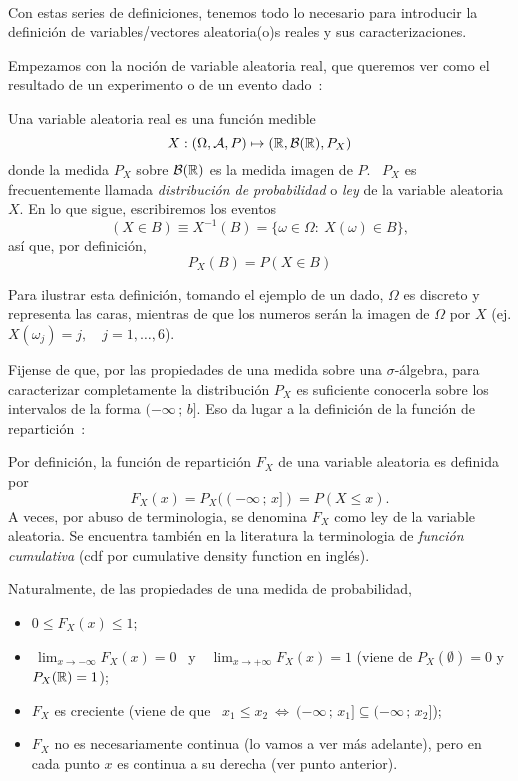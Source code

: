 \

Con estas series  de definiciones, tenemos todo lo  necesario para introducir la
definici\'on de variables/vectores aleatoria(o)s reales y sus caracterizaciones.



\label{Ssec:MP:VAGeneral}

Empezamos con la  noci\'on de variable aleatoria real, que  queremos ver como el
resultado de un experimento o de un evento dado~\cite{AthLah06, Coh13, Bre88}:
%
\begin{definicion}
  Una variable aleatoria real es una funci\'on medible
  \[
  X: (\Omega,\mathcal{A},P) \mapsto (\mathbb{R},\mathcal{B}(\mathbb{R}),P_X)
  \]
  donde la medida  $P_X$ sobre $\mathcal{B}(\mathbb{R})$ es la medida imagen  de $P$.  \ $P_X$
  es frecuentemente llamada {\it distribuci\'on  de probabilidad} o {\it ley} de
  la variable aleatoria $X$. En lo que sigue, escribiremos los eventos
  \[
  (X \in B) \equiv X^{-1}(B) = \{ \omega \in \Omega: \: X(\omega) \in B \},
  \]
  as\'i que, por definici\'on,
  \[
  P_X(B) = P(X \in B)
  \]
\end{definicion}
%
Para  ilustrar esta definici\'on,  tomando el  ejemplo de  un dado,  $\Omega$ es
discreto y representa  las caras, mientras de que los  numeros ser\'an la imagen
de $\Omega$ por $X$ (ej. $X(\omega_j) = j, \quad j = 1, \ldots , 6$).

Fijense de que, por las  propiedades de una medida sobre una $\sigma$-\'algebra,
para caracterizar completamente la  distribuci\'on $P_X$ es suficiente conocerla
sobre  los intervalos de  la forma  $(-\infty \,  ; \,  b]$. Eso  da lugar  a la
definici\'on  de  la funci\'on  de  repartici\'on~\cite{AthLah06, Coh13,  Bre88,
  HogMck13}:
%
\begin{definicion}
  Por  definici\'on,  la  funci\'on  de  repartici\'on  $F_X$  de  una  variable
  aleatoria es definida por
  \[
  F_X(x) = P_X((-\infty \, ; \, x]) = P(X \le x).
  \]
  A veces, por abuso de terminologia,  se denomina $F_X$ como ley de la variable
  aleatoria. Se  encuentra tambi\'en  en la literatura  la terminologia  de {\it
    funci\'on cumulativa} (cdf por cumulative density function en ingl\'es).
\end{definicion}
%
Naturalmente, de las propiedades de una medida de probabilidad,
%
\begin{itemize}
\item $0 \le F_X(x) \le 1$;
%
\item $\displaystyle \, \lim_{x \to -\infty} F_X(x) = 0$ \ y \ $\displaystyle \,
  \lim_{x \to +\infty} F_X(x) = 1$  (viene de $P_X(\emptyset) = 0$ y $P_X(\mathbb{R})
  = 1$);
%
\item  $F_X$ es creciente  \big(viene de  que \  $x_1 \le  x_2 \:  \Leftrightarrow \:
  (-\infty \, ; \, x_1] \subseteq (-\infty \, ; \, x_2]$\big);
%
\item $F_X$ no es necesariamente continua  (lo vamos a ver m\'as adelante), pero
  en cada punto $x$ es continua a su derecha (ver punto anterior).
\end{itemize}


